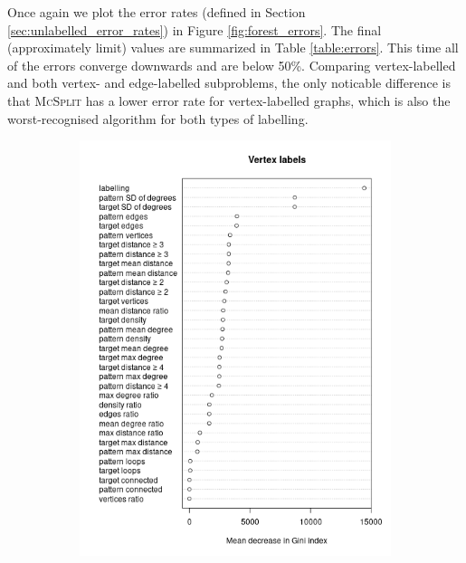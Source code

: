 \documentclass{l4proj}
\theoremstyle{definition}
\theoremstyle{remark}
\begin{document}
Once again we plot the error rates (defined in Section
\ref{sec:unlabelled_error_rates}) in Figure \ref{fig:forest_errors}. The final
(approximately limit) values are summarized in Table \ref{table:errors}.
This time all of the errors converge downwards and are below 50\%. Comparing
vertex-labelled and both vertex- and edge-labelled subproblems, the only
noticable difference is that \textsc{McSplit} has a lower error rate for
vertex-labelled graphs, which is also the worst-recognised algorithm for both
types of labelling.

\begin{figure}
  \centering
  \begin{subfigure}[t]{0.49\textwidth}
    \centering
    \includegraphics[width=\textwidth]{images/vertex_labels_variable_importance.png}
  \end{subfigure}
  \begin{subfigure}[t]{0.49\textwidth}
    \centering

\end{subfigure}
\end{figure}
\end{document}
